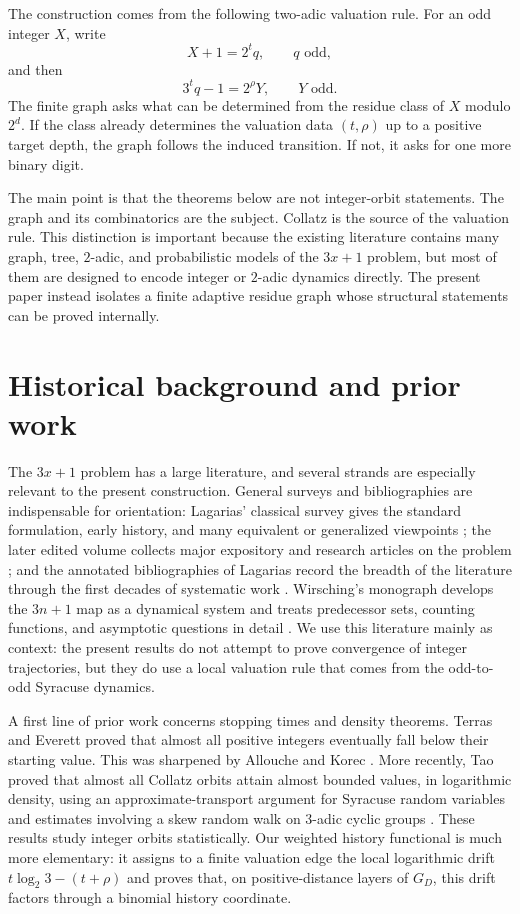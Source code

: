 \documentclass[11pt]{article}
\theoremstyle{definition}
\theoremstyle{remark}
\begin{document}
The construction comes from the following two-adic valuation rule.  For an odd integer $X$, write
\[
X+1=2^tq,\qquad q\text{ odd},
\]
and then
\[
3^tq-1=2^\rho Y,\qquad Y\text{ odd}.
\]
The finite graph asks what can be determined from the residue class of $X$ modulo $2^d$.  If the class already determines the valuation data $(t,\rho)$ up to a positive target depth, the graph follows the induced transition.  If not, it asks for one more binary digit.

The main point is that the theorems below are not integer-orbit statements.  The graph and its combinatorics are the subject.  Collatz is the source of the valuation rule.  This distinction is important because the existing literature contains many graph, tree, $2$-adic, and probabilistic models of the $3x+1$ problem, but most of them are designed to encode integer or $2$-adic dynamics directly.  The present paper instead isolates a finite adaptive residue graph whose structural statements can be proved internally.

\section{Historical background and prior work}\label{sec:related}

The $3x+1$ problem has a large literature, and several strands are especially relevant to the present construction.  General surveys and bibliographies are indispensable for orientation: Lagarias' classical survey gives the standard formulation, early history, and many equivalent or generalized viewpoints \cite{Lagarias1985}; the later edited volume collects major expository and research articles on the problem \cite{Lagarias2010}; and the annotated bibliographies of Lagarias record the breadth of the literature through the first decades of systematic work \cite{LagariasAnnotated1999,LagariasAnnotated2009}.  Wirsching's monograph develops the $3n+1$ map as a dynamical system and treats predecessor sets, counting functions, and asymptotic questions in detail \cite{Wirsching1998}.  We use this literature mainly as context: the present results do not attempt to prove convergence of integer trajectories, but they do use a local valuation rule that comes from the odd-to-odd Syracuse dynamics.

A first line of prior work concerns stopping times and density theorems.  Terras \cite{Terras1976} and Everett \cite{Everett1977} proved that almost all positive integers eventually fall below their starting value.  This was sharpened by Allouche \cite{Allouche1979} and Korec \cite{Korec1994}.  More recently, Tao proved that almost all Collatz orbits attain almost bounded values, in logarithmic density, using an approximate-transport argument for Syracuse random variables and estimates involving a skew random walk on $3$-adic cyclic groups \cite{Tao2022}.  These results study integer orbits statistically.  Our weighted history functional is much more elementary: it assigns to a finite valuation edge the local logarithmic drift $t\log_2 3-(t+\rho)$ and proves that, on positive-distance layers of $G_D$, this drift factors through a binomial history coordinate.
\end{document}
